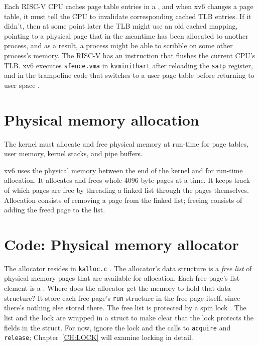 Each RISC-V CPU caches page table entries in a
, and when xv6 changes
a page table, it must tell the CPU to invalidate corresponding
cached TLB entries.  If it didn't,
then at some point later the TLB might
use an old cached mapping, pointing to a physical page that in the meantime
has been allocated to another process, and as a result, a process
might be able to scribble on some other process's memory.  The RISC-V
has an instruction  that flushes
the current CPU's TLB.
xv6 executes {\tt sfence.vma} in {\tt kvminithart}  after reloading the 
\texttt{satp} register, and in the trampoline code that
switches to a user page table before returning to user space
.

\section{Physical memory allocation}

The kernel must allocate and free physical memory at run-time for
page tables,
user memory,
kernel stacks,
and pipe buffers.

xv6 uses the physical memory between the end of the kernel and
for run-time allocation. It allocates and frees whole 4096-byte pages
at a time. It keeps track of which pages are free by threading a
linked list through the pages themselves. Allocation consists of
removing a page from the linked list; freeing consists of adding the
freed page to the list.
\section{Code: Physical memory allocator}

The allocator resides in {\tt kalloc.c} .
The allocator's data structure is a
\textit{free list}
of physical memory pages that are available
for allocation.
Each free page's list element is a
.
Where does the allocator get the memory
to hold that data structure?
It store each free page's
\lstinline{run}
structure in the free page itself,
since there's nothing else stored there.
The free list is
protected by a spin lock
.
The list and the lock are wrapped in a struct
to make clear that the lock protects the fields
in the struct.
For now, ignore the lock and the calls to
\lstinline{acquire}
and
\lstinline{release};
Chapter~\ref{CH:LOCK} will examine
locking in detail.

